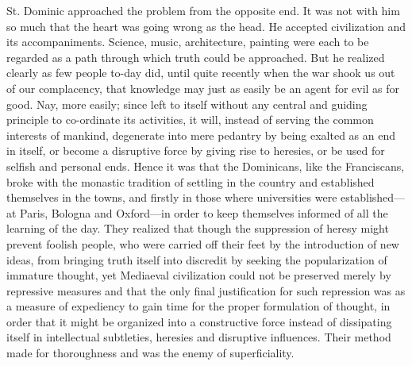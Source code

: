 \documentclass{book}
\begin{document}
St. Dominic approached the problem from the opposite end. It was not with him so much that the heart was going wrong as the head. He accepted civilization and its accompaniments. Science, music, architecture, painting were each to be regarded as a path through which truth could be approached. But he realized clearly as few people to-day did, until quite recently when the war shook us out of our complacency, that knowledge may just as easily be an agent for evil as for good. Nay, more easily; since left to itself without any central and guiding principle to co-ordinate its activities, it will, instead of serving the common interests of mankind, degenerate into mere pedantry by being exalted as an end in itself, or become a disruptive force by giving rise to heresies, or be used for selfish and personal ends. Hence it was that the Dominicans, like the Franciscans, broke with the monastic tradition of settling in the country and established themselves in the towns, and firstly in those where universities were established—at Paris, Bologna and Oxford—in order to keep themselves informed of all the learning of the day. They realized that though the suppression of heresy might prevent foolish people, who were carried off their feet by the introduction of new ideas, from bringing truth itself into discredit by seeking the popularization of immature thought, yet Mediaeval civilization could not be preserved merely by repressive measures and that the only final justification for such repression was as a measure of expediency to gain time for the proper formulation of thought, in order that it might be organized into a constructive force instead of dissipating itself in intellectual subtleties, heresies and disruptive influences. Their method made for thoroughness and was the enemy of superficiality.
\end{document}
